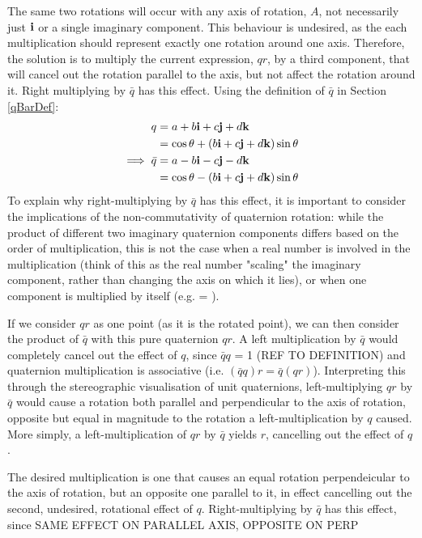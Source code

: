 \documentclass[10pt]{article}
\begin{document}
The same two rotations will occur with any axis of rotation, $A$, not necessarily just $\vb{i}$ or a single imaginary component. This behaviour is undesired, as the each multiplication should represent exactly one rotation around one axis. Therefore, the solution is to multiply the current expression, $qr$, by a third component, that will cancel out the rotation parallel to the axis, but not affect the rotation around it. Right multiplying by $\bar{q}$ has this effect. Using the definition of $\bar{q}$ in Section \ref{qBarDef}:
\begin{equation}
    \begin{aligned}
        q &= a + b\vb{i} + c\vb{j} + d\vb{k} \\
          &= \cos\theta + (b\vb{i} + c\vb{j} + d\vb{k})\sin\theta \\
        \implies \bar{q} &= a - b\vb{i} - c\vb{j} - d\vb{k} \\
          &= \cos\theta - (b\vb{i} + c\vb{j} + d\vb{k})\sin\theta
    \end{aligned}
\end{equation}
To explain why right-multiplying by $\bar{q}$ has this effect, it is important to consider the implications of the non-commutativity of quaternion rotation: while the product of different two imaginary quaternion components differs based on the order of multiplication, this is not the case when a real number is involved in the multiplication (think of this as the real number "scaling" the imaginary component, rather than changing the axis on which it lies), or when one component is multiplied by itself (e.g. \mult{} = \mult{}).

If we consider $qr$ as one point (as it is the rotated point), we can then consider the product of $\bar{q}$ with this pure quaternion $qr$. A left multiplication by $\bar{q}$ would completely cancel out the effect of $q$, since $\bar{q}q$ = 1 (REF TO DEFINITION) and quaternion multiplication is associative (i.e. $(\bar{q}q)r = \bar{q}(qr)$).
Interpreting this through the stereographic visualisation of unit quaternions, left-multiplying $qr$ by $\bar{q}$ would cause a rotation both parallel and perpendicular to the axis of rotation, opposite but equal in magnitude to the rotation a left-multiplication by $q$ caused. More simply, a left-multiplication of $qr$ by $\bar{q}$ yields $r$, cancelling out the effect of $q$.

The desired multiplication is one that causes an equal rotation perpendeicular to the axis of rotation, but an opposite one parallel to it, in effect cancelling out the second, undesired, rotational effect of $q$. Right-multiplying by $\bar{q}$ has this effect, since SAME EFFECT ON PARALLEL AXIS, OPPOSITE ON PERP
\end{document}
